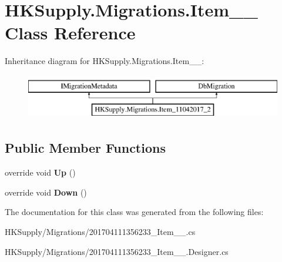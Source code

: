 \hypertarget{class_h_k_supply_1_1_migrations_1_1_item__11042017__2}{}\section{H\+K\+Supply.\+Migrations.\+Item\+\_\+\_ Class Reference}
\label{class_h_k_supply_1_1_migrations_1_1_item__11042017__2}
Inheritance diagram for H\+K\+Supply.\+Migrations.\+Item\+\_\+\_\+:\begin{figure}[H]
\begin{center}
\leavevmode
\includegraphics[height=2.000000cm]{class_h_k_supply_1_1_migrations_1_1_item__11042017__2}
\end{center}
\end{figure}
\subsection*{Public Member Functions}
\begin{DoxyCompactItemize}
\item 
\mbox{\label{class_h_k_supply_1_1_migrations_1_1_item__11042017__2_a78c271942be6096fb6f291caecce11bb}} 
override void {\bfseries Up} ()
\item 
\mbox{\label{class_h_k_supply_1_1_migrations_1_1_item__11042017__2_a1bb7cbf5ac4f060f945d034de91ff7ab}} 
override void {\bfseries Down} ()
\end{DoxyCompactItemize}


The documentation for this class was generated from the following files\+:\begin{DoxyCompactItemize}
\item 
H\+K\+Supply/\+Migrations/201704111356233\+\_\+\+Item\+\_\+\_.\+cs\item 
H\+K\+Supply/\+Migrations/201704111356233\+\_\+\+Item\+\_\+\_.\+Designer.\+cs\end{DoxyCompactItemize}

